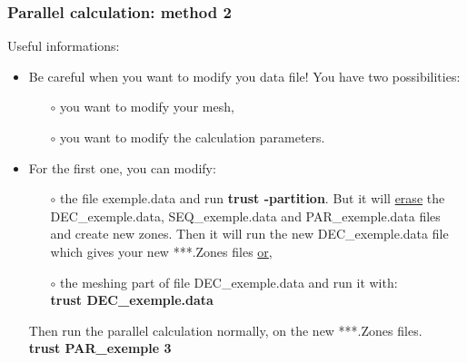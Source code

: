 \documentclass[10pt, hyperref={unicode=true,pdfusetitle, bookmarks=true,bookmarksnumbered=false,bookmarksopen=false, breaklinks=false,pdfborder={0 0 1},backref=true,colorlinks=true,linkcolor=darkblue,pageanchor}]{beamer}
\begin{document}
\begin{frame}
\frametitle{Parallel calculation: method 2}
\begin{block}{Useful informations:}

\begin{itemize}
\item Be careful when you want to modify you data file! You have two possibilities:
    \begin{itemize} 
    \item [$\circ$] you want to modify your mesh,
    \item [$\circ$] you want to modify the calculation parameters.
    \end{itemize}

\item For the first one, you can modify:
    \begin{itemize} 
    \item [$\circ$] the file exemple.data and run \textbf{trust -partition}. But it will \underline{erase} the DEC\_exemple.data, SEQ\_exemple.data and PAR\_exemple.data files and create new zones. Then it will run the new DEC\_exemple.data file which gives your new ***.Zones files \underline{or},
    \item [$\circ$] the meshing part of file DEC\_exemple.data and run it with:\\
    \textbf{trust DEC\_exemple.data} \\
    \end{itemize}
Then run the parallel calculation normally, on the new ***.Zones files.\\
\textbf{trust PAR\_exemple 3}

\end{itemize}

\end{block}
\end{frame}
\end{document}
